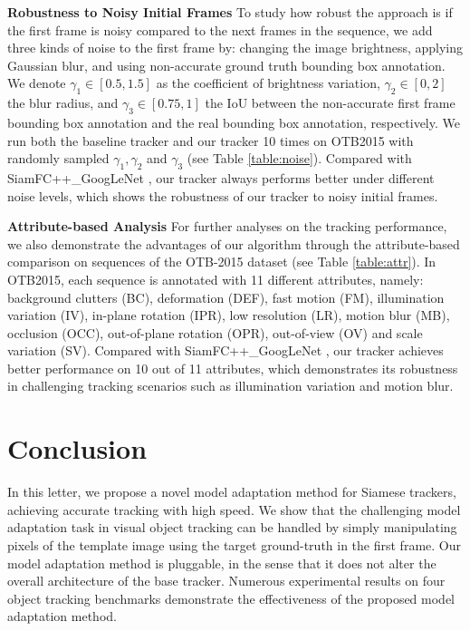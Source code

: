 \textbf{Robustness to Noisy Initial Frames} To study how robust the approach is if the first frame is noisy compared to the next frames in the sequence, we add three kinds of noise to the first frame by: changing the image brightness, applying Gaussian blur, and using non-accurate ground truth bounding box annotation. We denote $\gamma_1 \in [0.5, 1.5]$ as the coefficient of brightness variation, $\gamma_2 \in [0, 2]$ the blur radius, and $\gamma_3 \in [0.75, 1]$ the IoU between the non-accurate first frame bounding box annotation and the real bounding box annotation, respectively. We run both the baseline tracker and our tracker 10 times on OTB2015 with randomly sampled $\gamma_1, \gamma_2$ and $\gamma_3$ (see Table \ref{table:noise}). Compared with SiamFC++\_GoogLeNet \cite{SiamFC++}, our tracker always performs better under different noise levels, which shows the robustness of our tracker to noisy initial frames.%

\textbf{Attribute-based Analysis} For further analyses on the tracking performance, we also demonstrate the advantages of our algorithm through the attribute-based comparison on sequences of the OTB-2015 dataset (see Table \ref{table:attr}). In OTB2015, each sequence is annotated with 11 different attributes, namely: background clutters (BC), deformation (DEF), fast motion (FM), illumination variation (IV), in-plane rotation (IPR), low resolution (LR), motion blur (MB), occlusion (OCC), out-of-plane rotation (OPR), out-of-view (OV) and scale variation (SV). Compared with SiamFC++\_GoogLeNet \cite{SiamFC++}, our tracker achieves better performance on 10 out of 11 attributes, which demonstrates its robustness in challenging tracking scenarios such as illumination variation and motion blur.
\vspace{-1mm}

\section{Conclusion}
In this letter, we propose a novel model adaptation method for Siamese trackers, achieving accurate tracking with high speed. We show that the challenging model adaptation task in visual object tracking can be handled by simply manipulating pixels of the template image using the target ground-truth in the first frame. Our model adaptation method is pluggable, in the sense that it does not alter the overall architecture of the base tracker. Numerous experimental results on four object tracking benchmarks demonstrate the effectiveness of the proposed model adaptation method.